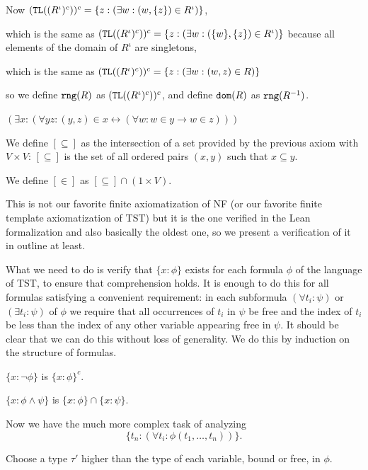 \documentclass{article}
\newif\ifshowannotations
\newcommand{\abf}{\ifshowannotations\bf\fi}
\theoremstyle{definition}
\theoremstyle{remark}
\begin{document}
{\begin{description}
Now $({\tt TL}((R^\iota)^c))^c = \{z:(\exists w:(w,\{z\})\in R^\iota)\}$,

which is the same as $({\tt TL}((R^\iota)^c))^c = \{z:(\exists w:(\{w\},\{z\})\in R^\iota)\}$ because all elements
of the domain of $R^{\iota}$ are singletons,

which is the same as $({\tt TL}((R^\iota)^c))^c = \{z:(\exists w:(w,z)\in R)\}$

so we define ${\tt rng}(R)$ as $({\tt TL}((R^\iota)^c))^c$,
and define ${\tt dom}(R)$ as ${\tt rng}(R^{-1})$.

\item[subset axiom:]  $(\exists x:(\forall yz:(y,z) \in x \leftrightarrow (\forall w:w \in y \rightarrow w \in z)))$

We define $[\subseteq]$ as the intersection of a set provided by the previous axiom with $V \times V$:  $[\subseteq]$ is the set of all ordered pairs $(x,y)$ such that $x \subseteq y$.

We define $[\in]$ as $[\subseteq]\cap (1 \times V)$.



\end{description}

This is not our favorite finite axiomatization of NF (or our favorite finite template axiomatization of TST) but it is the one verified in the Lean formalization and also basically the oldest one, so we present a verification of it in outline at least.

What we need to do is verify that $\{x:\phi\}$ exists for each formula $\phi$ of the language of TST, to ensure that comprehension holds.  {\abf It is enough to do this for all formulas satisfying a convenient requirement:  in each subformula $(\forall t_i:\psi)$ or $(\exists t_i:\psi)$ of $\phi$ we require that all occurrences of $t_i$ in $\psi$ be free and the index of $t_i$ be less than the index
of any other variable appearing free in $\psi$.  It should be clear that we can do this without loss of generality.}  We do this by induction on the structure of formulas.

$\{x:\neg \phi\}$ is $\{x :\phi\}^c$.

$\{x :\phi \wedge \psi\}$ is $\{x:\phi \} \cap \{x:\psi\}$.

Now we have the much more complex task of analyzing $$\{t_{n}:(\forall t_i:\phi(t_1,\ldots,t_n))\}.$$

Choose a type $\tau'$ higher than the type {\abf of each variable, bound or free, in $\phi$}.

}
\end{document}

